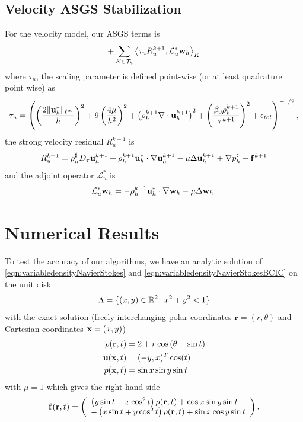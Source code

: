 \documentclass[letterpaper]{erdc}
\begin{document}
\subsection{Velocity ASGS Stabilization} For the velocity model, our ASGS terms is
\begin{equation}
  +\displaystyle\sum_{K\in\mathcal{T}_h}\left\langle \tau_u R_u^{k+1}, \mathcal{L}_u^{*} \textbf{w}_h \right\rangle_{K}
\end{equation}
where $\tau_u$, the scaling parameter is defined point-wise (or at least quadrature point wise) as
\begin{align}
\tau_u = \left(\left(\frac{2\|\textbf{u}^{*}_h\|_{\ell^{\infty}}}{h}\right)^2 + 9\left( \frac{4\mu}{h^2}\right)^2 + \left(\rho^{k+1}_h\nabla\cdot \textbf{u}^{k+1}_h\right)^2 + \left( \frac{\beta_0\rho^{k+1}_h}{\tau^{k+1}} \right)^2 + \epsilon_{tol}\right)^{-1/2},
\end{align}
the strong velocity residual $R_u^{k+1}$ is
\begin{equation}
  R_u^{k+1} = \rho_h^{\sharp}D_\tau \textbf{u}^{k+1}_h + \rho_h^{k+1}\textbf{u}_h^{*}\cdot\nabla\textbf{u}_h^{k+1} - \mu\Delta\textbf{u}_h^{k+1} + \nabla p_h^{\sharp} - \mathbf{f}^{k+1}
\end{equation}
and the adjoint operator $\mathcal{L}_{u}^{*}$ is
\begin{equation}
  \mathcal{L}_u^{*} \textbf{w}_h = -\rho_h^{k+1}\textbf{u}_h^{*}\cdot\nabla\textbf{w}_h - \mu\Delta \textbf{w}_h.
\end{equation}




%
%
%
\section{Numerical Results}
\label{sec:NumericalResults}

To test the accuracy of our algorithms, we have an analytic solution of
\ref{eqn:variabledensityNavierStokes} and
\ref{eqn:variabledensityNavierStokesBCIC} on the unit disk
\begin{equation}
  \Lambda = \{ (x,y) \in \mathbb{R}^{2} \:|\: x^2 + y^2 < 1 \}
\end{equation}
with the exact solution (freely interchanging polar coordinates $\mathbf{r} = (r,\theta)$ and Cartesian coordinates $\textbf{x} = (x,y)$)
\begin{align}
  \rho(\mathbf{r},t) & = 2 + r\cos\left(\theta - \sin t  \right)\\
  \textbf{u}(\textbf{x},t) &= (-y, x)^T \cos(t)\\
  p(\textbf{x},t) &= \sin x \sin y \sin t
\end{align}
with $\mu = 1$ which gives the right hand side
\begin{equation}
  \mathbf{f}(\mathbf{r},t) = \left(\begin{array}{l} \left( y\sin t - x\cos^2 t\right)\rho(\mathbf{r},t) + \cos x \sin y \sin t\\ -\left(x \sin t + y\cos^2 t\right)\rho(\mathbf{r},t) + \sin x \cos y \sin t \end{array}\right).
\end{equation}
\end{document}

